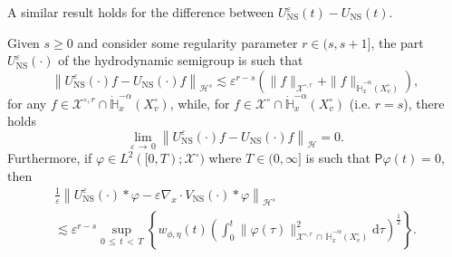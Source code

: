 \documentclass[AHL,Unicode,longabstracts,published]{cedram}
\newcommand{\ns}{\mathrm{NS}}
\renewcommand{\d}{\mathrm{d}}
\newcommand{\bbH}{\mathbb{H}}
\newcommand{\XX}{\mathcal{X}}
\newcommand{\PP}{\mathsf{P}}
\newcommand{\HHH}{\mathscr{H}}
\newcommand{\SSSs}{\HHH}
\newcommand{\rSSSs}[1]{\HHH^{#1}}
\newcommand{\Slm}{X^{\circ}}
\newcommand{\SSlm}{\XX^{\circ}}
\newcommand{\rSSlm}[1]{\XX^{{\circ}, #1}}
\renewcommand*\le{\leqslant}
\renewcommand*\ge{\geqslant}
\newcommand*\eps{{\varepsilon}}
\begin{document}
A similar result holds for the difference between $U^{\eps}_{\ns}(t)-U_{\ns}(t)$.


\begin{lemm}\label{lem:asymptotic_equiv_NS_semigroup}
Given $s \ge0$ and consider some regularity parameter $r \in (s, s+1]$, the part $U^\eps_\ns(\cdot)$ of the hydrodynamic semigroup is such that
\begin{equation}\label{eq:asymptotic_equiv_NS_reg}
\left\| U^\eps_\ns(\cdot) f - U_\ns(\cdot) f \right\|_{\rSSSs{s}} \lesssim \eps^{r - s} \left(\| f \|_{\rSSlm{r}} + \| f \|_{ \dot{\bbH}^{-\alpha}_x (\Slm_v) } \right),
\end{equation}
for any $f \in \rSSlm{r} \cap \dot{\bbH}^{-\alpha}_x(\Slm_v)$, while, for $f \in \SSlm \cap \dot{\bbH}^{-\alpha}_x (\Slm_v)$ (i.e. $r=s$), there holds
\begin{equation}\label{eq:asymptotic_equiv_NS_general}
\lim_{\eps\,\to \,0}\left\| U^\eps_\ns(\cdot) f - U_\ns(\cdot) f \right\|_\SSSs = 0.
\end{equation}
Furthermore, if $\varphi \in L^2([0, T) ; \SSlm )$ where $T \in (0, \infty]$ is such that $\PP \varphi(t) = 0$, then
\begin{multline}\label{eq:asymptotic_equiv_NS_orthogonal_reg}
\frac{1}{\eps} \left\| U^\eps_\ns(\cdot) * \varphi - \eps \nabla_x \cdot V_\ns(\cdot) * \varphi \right\|_{\rSSSs{s}} \\
\lesssim \eps^{r - s} \sup_{0\,\le\,t\,<\,T} \left\{w_{\phi, \eta}(t) \left(\int_0^t \| \varphi(\tau) \|_{ \rSSlm{r}\,\cap\,\dot{\bbH}^{-\alpha}_x (\Slm_v) }^2 \d \tau \right)^{\frac{1}{2}} \right\}.
\end{multline}
\end{lemm}
\end{document}
